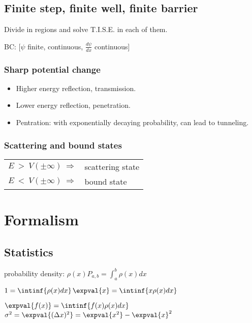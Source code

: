 \documentclass[10pt,a4paper]{scrartcl}
\begin{document}
\begin{multicols*}{3}
	\subsection{Finite step, finite well, finite barrier}
	
	Divide in regions and solve T.I.S.E. in each of them. 
	
	BC: [$\psi$ finite, continuous, $\frac{d\psi}{dx}$ continuous]
	
	
	\subsubsection{Sharp potential change}
	
	\begin{itemize}
	\compaq
	\item
	Higher energy \dahe reflection, transmission.
	\item
	Lower energy \dahe reflection, penetration.
	\item
	Pentration: with exponentially decaying probability, can lead to tunneling.	
	\end{itemize}
		
	\subsubsection{Scattering and bound states}
	
	\begin{tabular}{ll}
	$E\ >\ V(\pm\infty)\ \Rightarrow$&scattering state\\
	$E\ <\ V(\pm\infty)\ \Rightarrow$&bound state
	\end{tabular}
		
	\section{Formalism}
	
	\subsection{Statistics}
	
	probability density: $\rho(x)$\hfill $P_{a,b}=\int_a^b{\rho(x)dx}$
	
	$1=\intinf{\rho(x)dx}$\hfill$\expval{x}=\intinf{x\rho(x)dx}$
	
	$\expval{f(x)}=\intinf{f(x)\rho(x)dx}$\hfill$\sigma^2=\expval{(\Delta x)^2}=\expval{x^2}-\expval{x}^2$


\end{multicols*}
\end{document}
